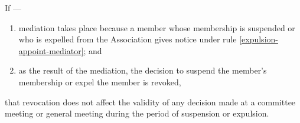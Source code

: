 \documentclass[../constitution.tex]{subfiles}
\begin{document}
If ---

  \begin{enumerate}
  \def\labelenumi{\alph{enumi})}
  \setcounter{enumi}{0}
  \item mediation takes place because a member whose membership is suspended or who is expelled from the Association gives notice under rule \ref{expulsion-appoint-mediator}; and
  \item as the result of the mediation, the decision to suspend the member's membership or expel the member is revoked,
  \end{enumerate}

that revocation does not affect the validity of any decision made at a committee meeting or general meeting during the period of suspension or expulsion.
\end{document}
